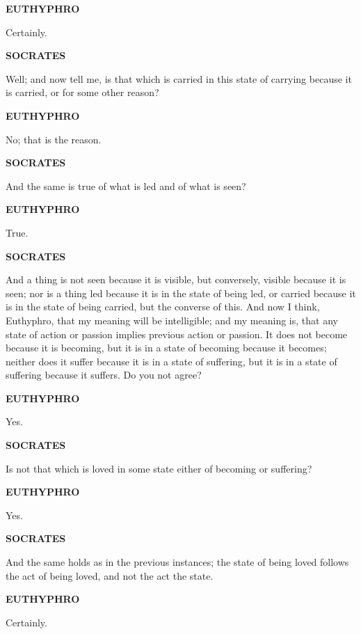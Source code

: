 \documentclass[11pt,letter]{article}
\begin{document}
\par \textbf{EUTHYPHRO}
\par   Certainly.

\par \textbf{SOCRATES}
\par   Well; and now tell me, is that which is carried in this state of carrying because it is carried, or for some other reason?

\par \textbf{EUTHYPHRO}
\par   No; that is the reason.

\par \textbf{SOCRATES}
\par   And the same is true of what is led and of what is seen?

\par \textbf{EUTHYPHRO}
\par   True.

\par \textbf{SOCRATES}
\par   And a thing is not seen because it is visible, but conversely, visible because it is seen; nor is a thing led because it is in the state of being led, or carried because it is in the state of being carried, but the converse of this. And now I think, Euthyphro, that my meaning will be intelligible; and my meaning is, that any state of action or passion implies previous action or passion. It does not become because it is becoming, but it is in a state of becoming because it becomes; neither does it suffer because it is in a state of suffering, but it is in a state of suffering because it suffers. Do you not agree?

\par \textbf{EUTHYPHRO}
\par   Yes.

\par \textbf{SOCRATES}
\par   Is not that which is loved in some state either of becoming or suffering?

\par \textbf{EUTHYPHRO}
\par   Yes.

\par \textbf{SOCRATES}
\par   And the same holds as in the previous instances; the state of being loved follows the act of being loved, and not the act the state.

\par \textbf{EUTHYPHRO}
\par   Certainly.
\end{document}
